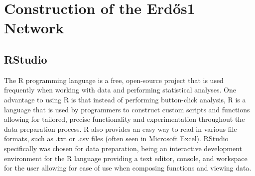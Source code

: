 \documentclass[17pt]{extarticle}
\begin{document}
\section{Construction of the Erd\H{o}s1 Network}
\subsection{RStudio}
\indent The R programming language is a free, open-source project that is used frequently when working with data and performing statistical analyses. One advantage to using R is that instead of performing button-click analysis, R is a language that is used by programmers to construct custom scripts and functions allowing for tailored, precise functionality and experimentation throughout the data-preparation process. R also provides an easy way to read in various file formats, such as .txt or .csv files (often seen in Microsoft Excel). RStudio specifically was chosen for data preparation, being an interactive development environment for the R language providing a text editor, console, and workspace for the user allowing for ease of use when composing functions and viewing data.
\end{document}
